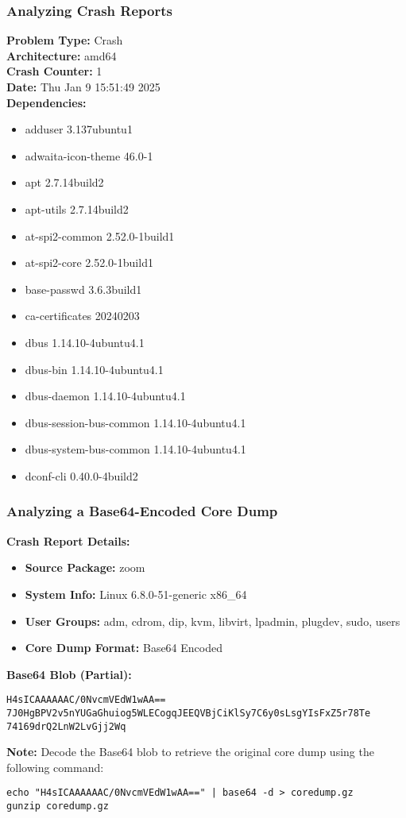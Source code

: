 \begin{frame}[fragile]
\frametitle{Analyzing Crash Reports}

\textbf{Problem Type:} Crash \\
\textbf{Architecture:} amd64 \\
\textbf{Crash Counter:} 1 \\
\textbf{Date:} Thu Jan 9 15:51:49 2025 \\

\textbf{Dependencies:}
\begin{itemize}
    \item adduser 3.137ubuntu1
    \item adwaita-icon-theme 46.0-1
    \item apt 2.7.14build2
    \item apt-utils 2.7.14build2
    \item at-spi2-common 2.52.0-1build1
    \item at-spi2-core 2.52.0-1build1
    \item base-passwd 3.6.3build1
    \item ca-certificates 20240203
    \item dbus 1.14.10-4ubuntu4.1
    \item dbus-bin 1.14.10-4ubuntu4.1
    \item dbus-daemon 1.14.10-4ubuntu4.1
    \item dbus-session-bus-common 1.14.10-4ubuntu4.1
    \item dbus-system-bus-common 1.14.10-4ubuntu4.1
    \item dconf-cli 0.40.0-4build2
\end{itemize}

\end{frame}

\begin{frame}[fragile]
\frametitle{Analyzing a Base64-Encoded Core Dump}

\textbf{Crash Report Details:}
\begin{itemize}
    \item \textbf{Source Package:} zoom
    \item \textbf{System Info:} Linux 6.8.0-51-generic x86\_64
    \item \textbf{User Groups:} adm, cdrom, dip, kvm, libvirt, lpadmin, plugdev, sudo, users
    \item \textbf{Core Dump Format:} Base64 Encoded
\end{itemize}

\textbf{Base64 Blob (Partial):}
\begin{verbatim}
H4sICAAAAAAC/0NvcmVEdW1wAA==
7J0HgBPV2v5nYUGaGhuiog5WLECogqJEEQVBjCiKlSy7C6y0sLsgYIsFxZ5r78Te
74169drQ2LnW2LvGjj2Wq
\end{verbatim}

\textbf{Note:} Decode the Base64 blob to retrieve the original core dump using the following command:
\begin{verbatim}
echo "H4sICAAAAAAC/0NvcmVEdW1wAA==" | base64 -d > coredump.gz
gunzip coredump.gz
\end{verbatim}

\end{frame}

